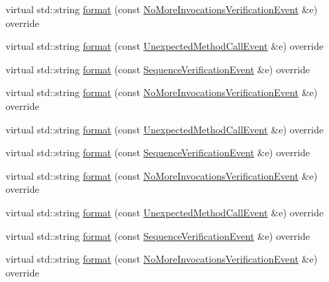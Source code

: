 \begin{DoxyCompactItemize}
virtual std\+::string \mbox{\hyperlink{structfakeit_1_1DefaultEventFormatter_afb224f9544f3a399cd95b57d90f2285b}{format}} (const \mbox{\hyperlink{structfakeit_1_1NoMoreInvocationsVerificationEvent}{No\+More\+Invocations\+Verification\+Event}} \&e) override
\item 
virtual std\+::string \mbox{\hyperlink{structfakeit_1_1DefaultEventFormatter_a8889e692f6ef77c543d07897d659d82b}{format}} (const \mbox{\hyperlink{structfakeit_1_1UnexpectedMethodCallEvent}{Unexpected\+Method\+Call\+Event}} \&e) override
\item 
virtual std\+::string \mbox{\hyperlink{structfakeit_1_1DefaultEventFormatter_a51d3e08835bb3b26ed615b004018a038}{format}} (const \mbox{\hyperlink{structfakeit_1_1SequenceVerificationEvent}{Sequence\+Verification\+Event}} \&e) override
\item 
virtual std\+::string \mbox{\hyperlink{structfakeit_1_1DefaultEventFormatter_afb224f9544f3a399cd95b57d90f2285b}{format}} (const \mbox{\hyperlink{structfakeit_1_1NoMoreInvocationsVerificationEvent}{No\+More\+Invocations\+Verification\+Event}} \&e) override
\item 
virtual std\+::string \mbox{\hyperlink{structfakeit_1_1DefaultEventFormatter_a8889e692f6ef77c543d07897d659d82b}{format}} (const \mbox{\hyperlink{structfakeit_1_1UnexpectedMethodCallEvent}{Unexpected\+Method\+Call\+Event}} \&e) override
\item 
virtual std\+::string \mbox{\hyperlink{structfakeit_1_1DefaultEventFormatter_a51d3e08835bb3b26ed615b004018a038}{format}} (const \mbox{\hyperlink{structfakeit_1_1SequenceVerificationEvent}{Sequence\+Verification\+Event}} \&e) override
\item 
virtual std\+::string \mbox{\hyperlink{structfakeit_1_1DefaultEventFormatter_afb224f9544f3a399cd95b57d90f2285b}{format}} (const \mbox{\hyperlink{structfakeit_1_1NoMoreInvocationsVerificationEvent}{No\+More\+Invocations\+Verification\+Event}} \&e) override
\item 
virtual std\+::string \mbox{\hyperlink{structfakeit_1_1DefaultEventFormatter_a8889e692f6ef77c543d07897d659d82b}{format}} (const \mbox{\hyperlink{structfakeit_1_1UnexpectedMethodCallEvent}{Unexpected\+Method\+Call\+Event}} \&e) override
\item 
virtual std\+::string \mbox{\hyperlink{structfakeit_1_1DefaultEventFormatter_a51d3e08835bb3b26ed615b004018a038}{format}} (const \mbox{\hyperlink{structfakeit_1_1SequenceVerificationEvent}{Sequence\+Verification\+Event}} \&e) override
\item 
virtual std\+::string \mbox{\hyperlink{structfakeit_1_1DefaultEventFormatter_afb224f9544f3a399cd95b57d90f2285b}{format}} (const \mbox{\hyperlink{structfakeit_1_1NoMoreInvocationsVerificationEvent}{No\+More\+Invocations\+Verification\+Event}} \&e) override
\end{DoxyCompactItemize}


